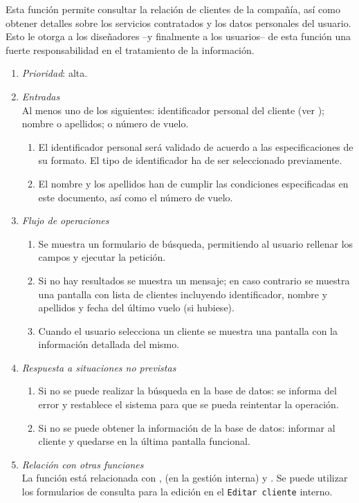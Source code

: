 

 \label{fun:consultarcliente}
	Esta función permite consultar la relación de clientes de la compañía, así como obtener detalles sobre los servicios contratados y los datos personales del usuario. Esto le otorga a los diseñadores --y finalmente a los usuarios-- de esta función una fuerte responsabilidad en el tratamiento de la información.

	\begin{enumerate}
		\item \textit{Prioridad}: alta.
		\item \textit{Entradas}\\
			Al menos uno de los siguientes: identificador personal del cliente (ver ); nombre o apellidos; o número de vuelo.
			\begin{enumerate}
				\item El identificador personal será validado de acuerdo a las especificaciones de su formato. El tipo de identificador ha de ser seleccionado previamente.
				\item El nombre y los apellidos han de cumplir las condiciones especificadas en este documento, así como el número de vuelo.
			\end{enumerate}
		\item \textit{Flujo de operaciones}
			\begin{enumerate}
				\item Se muestra un formulario de búsqueda, permitiendo al usuario rellenar los campos y ejecutar la petición.
				\item Si no hay resultados se muestra un mensaje; en caso contrario se muestra una pantalla con lista de clientes incluyendo identificador, nombre y apellidos y fecha del último vuelo (si hubiese).
				\item Cuando el usuario selecciona un cliente se muestra una pantalla con la información detallada del mismo.
			\end{enumerate}
		\item \textit{Respuesta a situaciones no previstas}
			\begin{enumerate}
				\item Si no se puede realizar la búsqueda en la base de datos: se informa del error y restablece el sistema para que se pueda reintentar la operación.
				\item Si no se puede obtener la información de la base de datos: informar al cliente y quedarse en la última pantalla funcional.
			\end{enumerate}
		\item \textit{Relación con otras funciones}\\
		La función está relacionada con ,  (en la gestión interna) y . Se puede utilizar los formularios de consulta para la edición en el \verb|Editar cliente| interno.
	\end{enumerate}

